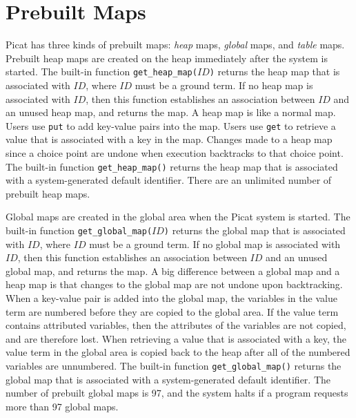 \section{\label{prebuiltmaps}Prebuilt Maps}
Picat has three kinds of prebuilt maps: {\it heap} maps, {\it global} maps, and {\it table} maps. Prebuilt heap maps  are created on the heap immediately after the system is started. The built-in function \texttt{get\_heap\_map($ID$)} returns the heap map that is associated with $ID$, where $ID$ must be a ground term. If no heap map is associated with $ID$, then this function establishes an association between $ID$ and an unused heap map, and returns the map. A heap map is like a normal map. Users use \texttt{put} to add key-value pairs into the map. Users use \texttt{get} to retrieve a value that is associated with a key in the map. Changes made to a heap map since a choice point are undone when execution backtracks to that choice point. The built-in function \texttt{get\_heap\_map()} returns the heap map that is associated with a system-generated default identifier. There are an unlimited number of prebuilt heap maps.

Global maps  are created in the global area when the Picat system is started. The built-in function \texttt{get\_global\_map($ID$)} returns the global map that is associated with $ID$, where $ID$ must be a ground term. If no global map is associated with $ID$, then this function establishes an association between $ID$ and an unused global map, and returns the map. A big difference between a global map and a heap map is that changes to the global map are not undone upon backtracking. When a key-value pair is added into the global map, the variables in the value term are numbered before they are copied to the global area. If the value term contains attributed variables, then the attributes of the variables are not copied, and are therefore lost. When retrieving a value that is associated with a key, the value term in the global area is copied back to the heap after all of the numbered variables are unnumbered. The built-in function \texttt{get\_global\_map()} returns the global map that is associated with a system-generated default identifier. The number of prebuilt global maps is 97, and the system halts if a program requests more than 97 global maps.

